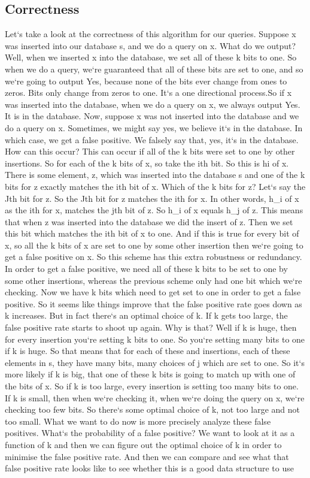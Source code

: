 \subsection{Correctness}
Let`s take a look at the correctness of this algorithm for our queries.
Suppose x was inserted into our database s, and we do a query on x.
What do we output? Well, when we inserted x into the database, we set all of these k bits to one.
So when we do a query, we`re guaranteed that all of these bits are set to one, and so we`re going to output Yes, because none of the bits ever change from ones to zeros.
Bits only change from zeros to one.
It`s a one directional process.So if x was inserted into the database, when we do a query on x, we always output Yes.
It is in the database.
Now, suppose x was not inserted into the database and we do a query on x.
Sometimes, we might say yes, we believe it`s in the database.
In which case, we get a false positive.
We falsely say that, yes, it`s in the database.
How can this occur? This can occur if all of the k bits were set to one by other insertions.
So for each of the k bits of x, so take the ith bit.
So this is hi of x.
There is some element, z, which was inserted into the database s and one of the k bits for z exactly matches the ith bit of x.
Which of the k bits for z? Let`s say the Jth bit for z.
So the Jth bit for z matches the ith for x.
In other words, h\_i of x as the ith for x, matches the jth bit of z.
So h\_i of x equals h\_j of z.
This means that when z was inserted into the database we did the insert of z.
Then we set this bit which matches the ith bit of x to one.
And if this is true for every bit of x, so all the k bits of x are set to one by some other insertion then we`re going to get a false positive on x.
So this scheme has this extra robustness or redundancy.
In order to get a false positive, we need all of these k bits to be set to one by some other insertions, whereas the previous scheme only had one bit which we`re checking.
Now we have k bits which need to get set to one in order to get a false positive.
So it seems like things improve that the false positive rate goes down as k increases.
But in fact there`s an optimal choice of k.
If k gets too large, the false positive rate starts to shoot up again.
Why is that? Well if k is huge, then for every insertion you`re setting k bits to one.
So you`re setting many bits to one if k is huge.
So that means that for each of these and insertions, each of these elements in s, they have many bits, many choices of j which are set to one.
So it`s more likely if k is big, that one of these k bits is going to match up with one of the bits of x.
So if k is too large, every insertion is setting too many bits to one.
If k is small, then when we`re checking it, when we`re doing the query on x, we`re checking too few bits.
So there`s some optimal choice of k, not too large and not too small.
What we want to do now is more precisely analyze these false positives.
What`s the probability of a false positive? We want to look at it as a function of k and then we can figure out the optimal choice of k in order to minimise the false positive rate.
And then we can compare and see what that false positive rate looks like to see whether this is a good data structure to use


